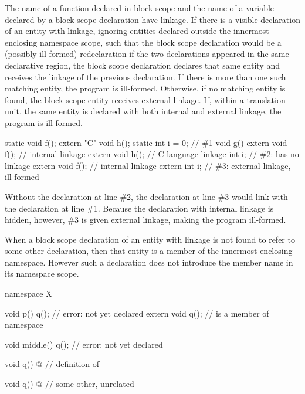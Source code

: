 \pnum
The name of a function declared in block scope and the name of a variable declared by a
block scope  declaration have linkage. If there is a visible declaration
of an entity with linkage, ignoring entities declared
outside the innermost enclosing namespace scope,
such that the block scope declaration would be
a (possibly ill-formed) redeclaration
if the two declarations appeared in the same declarative region,
the block scope declaration declares
that same entity and receives the linkage of the previous declaration. If there is more
than one such matching entity, the program is ill-formed. Otherwise, if no matching
entity is found, the block scope entity receives external linkage.
If, within a translation unit, the same entity is declared with both
internal and external linkage, the program is ill-formed.
\begin{example}
\begin{codeblock}
static void f();
extern "C" void h();
static int i = 0;               // \#1
void g() {
  extern void f();              // internal linkage
  extern void h();              // C language linkage
  int i;                        // \#2:  has no linkage
  {
    extern void f();            // internal linkage
    extern int i;               // \#3: external linkage, ill-formed
  }
}
\end{codeblock}

Without the declaration at line \#2,
the declaration at line \#3 would link with the declaration at line \#1.
Because the declaration with internal linkage is hidden, however,
\#3 is given external linkage, making the program ill-formed.
\end{example}

\pnum
When a block scope declaration of an entity with linkage is not found to
refer to some other declaration, then that entity is a member of the
innermost enclosing namespace. However such a declaration does not
introduce the member name in its namespace scope. \begin{example}

\begin{codeblock}
namespace X {
  void p() {
    q();                        // error:  not yet declared
    extern void q();            //  is a member of namespace 
  }

  void middle() {
    q();                        // error:  not yet declared
  }

  void q() { @\commentellip@ }        // definition of 
}

void q() { @\commentellip@ }          // some other, unrelated 
\end{codeblock}
\end{example}

